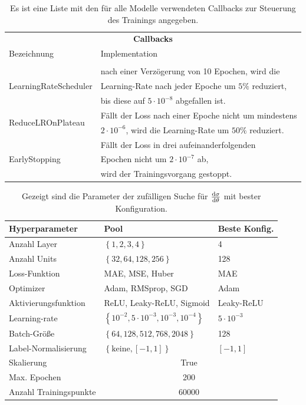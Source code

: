 \begin{table}
	\centering
	\caption{Es ist eine Liste mit den für alle Modelle verwendeten Callbacks zur Steuerung des Trainings angegeben.}
	\begin{tabular}{ll}
		\multicolumn{2}{c}{\textbf{Callbacks}} \\[5pt]
		Bezeichnung & Implementation\\
		\hline\\[-10pt]
		\multirow{3}{*}{LearningRateScheduler} & nach einer Verzögerung von 10 Epochen, wird die \\
		& Learning-Rate nach jeder Epoche um $5\%$ reduziert, \\
		& bis diese auf $5 \cdot 10^{-8}$ abgefallen ist. \\[5pt]
		\multirow{2}{*}{ReduceLROnPlateau}& Fällt der Loss nach einer Epoche nicht um mindestens\\
		& $2 \cdot 10^{-6}$, wird die Learning-Rate um $50\%$ reduziert.\\[5pt]
		\multirow{3}{*}{EarlyStopping}& Fällt der Loss in drei aufeinanderfolgenden \\
		& Epochen nicht um $2 \cdot 10^{-7}$ ab, \\
		& wird der Trainingsvorgang gestoppt.\\
		\hline
	\end{tabular}
	\label{Callbacks}
\end{table}
\begin{table}
	\centering
	\caption{Gezeigt sind die Parameter der zufälligen Suche für $\derivative{\sigma}{\theta}$ mit bester Konfiguration.}
	\begin{tabular}{lll}
		Hyperparameter & Pool & Beste Konfig. \\
		\hline\hline
		Anzahl Layer & $\left\lbrace 1, 2, 3, 4 \right\rbrace$ & 4 \\
		Anzahl Units & $\left\lbrace 32, 64, 128, 256\right\rbrace$ & 128 \\
		Loss-Funktion & MAE, MSE, Huber & MAE \\
		Optimizer & Adam, RMSprop, SGD  & Adam\\
		Aktivierungsfunktion & ReLU, Leaky-ReLU, Sigmoid & Leaky-ReLU \\
		Learning-rate & $\left\lbrace 10^{-2}, 5 \cdot 10^{-3}, 10^{-3}, 10^{-4} \right\rbrace $ & $5 \cdot 10^{-3}$\\
		Batch-Größe & $\left\lbrace 64, 128, 512, 768, 2048 \right\rbrace $ & 128\\
		Label-Normalisierung & $\left\lbrace \text{keine}, [-1,1]\right\rbrace $ & $[-1,1]$\\
		\hline
		Skalierung & \multicolumn{2}{c}{True} \\
		Max. Epochen & \multicolumn{2}{c}{200}\\
		Anzahl Trainingspunkte & \multicolumn{2}{c}{60000} \\
		\hline
	\end{tabular}
	\label{hyperparameter-theta}
\end{table}
